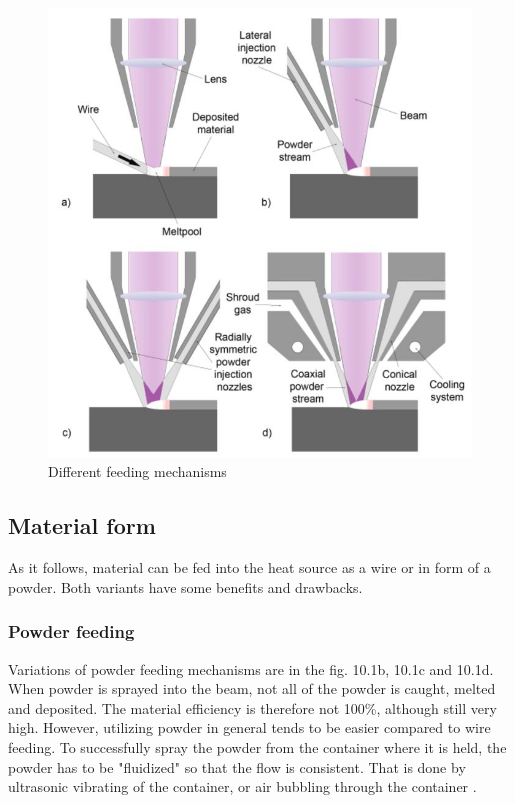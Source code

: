 \documentclass[a4paper, 11pt, reqno]{report}
\begin{document}
\begin{figure}[b!]
	\centering
	\includegraphics[scale=0.8]{DEDnozzles}
	\caption{Different feeding mechanisms \cite{engineering}}
\end{figure}

\subsection{Material form}
As it follows, material can be fed into the heat source as a wire or in form of a powder. Both variants have some benefits and drawbacks.
\subsubsection{Powder feeding}
Variations of powder feeding mechanisms are in the fig. 10.1b, 10.1c and 10.1d. When powder is sprayed into the beam, not all of the powder is caught, melted and deposited. The material efficiency is therefore not 100\%, although still very high. However, utilizing powder in general tends to be easier compared to wire feeding. To successfully spray the powder from the container where it is held, the powder has to be "fluidized" so that the flow is consistent. That is done by ultrasonic vibrating of the container, or air bubbling through the container \cite[p. 251]{AMT}.
\end{document}
